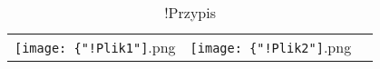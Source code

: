 \begin{table}[h]
\begin{tabularx}{1\textwidth}{@{\hspace{1.7 mm}}Xcc@{\hspace{1.7 mm}}}
\texttt{[image: \{"!Plik1"]}.png}
&
  \texttt{[image: \{"!Plik2"]}.png}  \\
\end{tabularx}
\caption{!Przypis}
\end{table}

